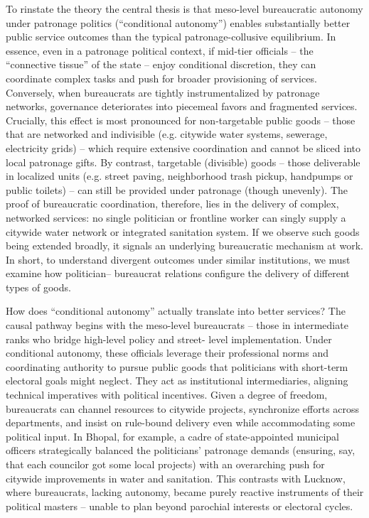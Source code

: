 To rinstate the theory the central thesis is that meso-level bureaucratic autonomy under patronage politics (``conditional autonomy'') enables substantially better public service outcomes than the typical patronage-collusive equilibrium. In essence, even in a patronage political context, if mid-tier officials – the ``connective tissue'' of the state – enjoy conditional discretion, they can coordinate complex tasks and push for broader provisioning of services. Conversely, when bureaucrats are tightly instrumentalized by patronage networks, governance deteriorates into piecemeal favors and fragmented services. Crucially, this effect is most pronounced for non-targetable public goods – those that are networked and indivisible (e.g. citywide water systems, sewerage, electricity grids) – which require extensive coordination and cannot be sliced into local patronage gifts. By contrast, targetable (divisible) goods – those deliverable in localized units (e.g. street paving, neighborhood trash pickup, handpumps or public toilets) – can still be provided under patronage (though unevenly). The proof of bureaucratic coordination, therefore, lies in the delivery of complex, networked services: no single politician or frontline worker can singly supply a citywide water network or integrated sanitation system. If we observe such goods being extended broadly, it signals an underlying bureaucratic mechanism at work. In short, to understand divergent outcomes under similar institutions, we must examine how politician– bureaucrat relations configure the delivery of different types of goods.

How does ``conditional autonomy'' actually translate into better services? The causal pathway begins with the meso-level bureaucrats – those in intermediate ranks who bridge high-level policy and street- level implementation. Under conditional autonomy, these officials leverage their professional norms and coordinating authority to pursue public goods that politicians with short-term electoral goals might neglect. They act as institutional intermediaries, aligning technical imperatives with political incentives. Given a degree of freedom, bureaucrats can channel resources to citywide projects, synchronize efforts across departments, and insist on rule-bound delivery even while accommodating some political input. In Bhopal, for example, a cadre of state-appointed municipal officers strategically balanced the politicians' patronage demands (ensuring, say, that each councilor got some local projects) with an overarching push for citywide improvements in water and sanitation. This contrasts with Lucknow, where bureaucrats, lacking autonomy, became purely reactive instruments of their political masters – unable to plan beyond parochial interests or electoral cycles.

